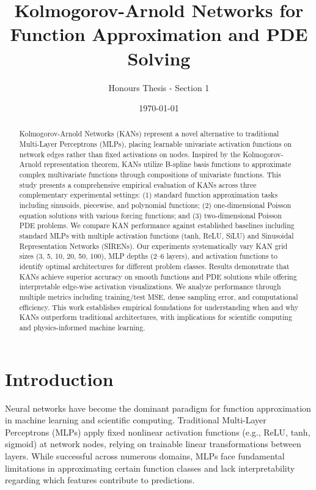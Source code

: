 \documentclass[11pt,a4paper]{article}
\title{Kolmogorov-Arnold Networks for Function Approximation and PDE Solving}
\author{Honours Thesis - Section 1}
\date{\today}
\begin{document}
\maketitle

\begin{abstract}
Kolmogorov-Arnold Networks (KANs) represent a novel alternative to traditional Multi-Layer Perceptrons (MLPs), placing learnable univariate activation functions on network edges rather than fixed activations on nodes. Inspired by the Kolmogorov-Arnold representation theorem, KANs utilize B-spline basis functions to approximate complex multivariate functions through compositions of univariate functions. This study presents a comprehensive empirical evaluation of KANs across three complementary experimental settings: (1) standard function approximation tasks including sinusoids, piecewise, and polynomial functions; (2) one-dimensional Poisson equation solutions with various forcing functions; and (3) two-dimensional Poisson PDE problems. We compare KAN performance against established baselines including standard MLPs with multiple activation functions (tanh, ReLU, SiLU) and Sinusoidal Representation Networks (SIRENs). Our experiments systematically vary KAN grid sizes (3, 5, 10, 20, 50, 100), MLP depths (2--6 layers), and activation functions to identify optimal architectures for different problem classes. Results demonstrate that KANs achieve superior accuracy on smooth functions and PDE solutions while offering interpretable edge-wise activation visualizations. We analyze performance through multiple metrics including training/test MSE, dense sampling error, and computational efficiency. This work establishes empirical foundations for understanding when and why KANs outperform traditional architectures, with implications for scientific computing and physics-informed machine learning.
\end{abstract}

\section{Introduction}

Neural networks have become the dominant paradigm for function approximation in machine learning and scientific computing. Traditional Multi-Layer Perceptrons (MLPs) apply fixed nonlinear activation functions (e.g., ReLU, tanh, sigmoid) at network nodes, relying on trainable linear transformations between layers. While successful across numerous domains, MLPs face fundamental limitations in approximating certain function classes and lack interpretability regarding which features contribute to predictions.
\end{document}
